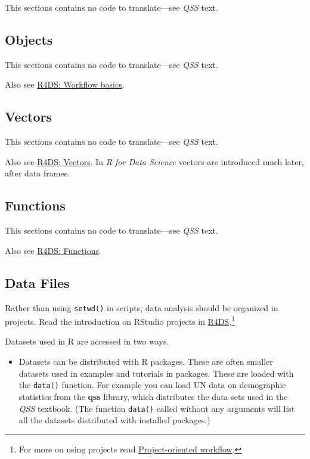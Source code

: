 \documentclass[]{book}
\providecommand{\tightlist}{%
  \setlength{\itemsep}{0pt}\setlength{\parskip}{0pt}}
\let\rmarkdownfootnote\footnote%
\def\footnote{\protect\rmarkdownfootnote}
\theoremstyle{definition}
\theoremstyle{definition}
\theoremstyle{definition}
\theoremstyle{remark}
\begin{document}
This sections contains no code to translate---see \emph{QSS} text.

\hypertarget{objects}{%
\subsection{Objects}\label{objects}}

This sections contains no code to translate---see \emph{QSS} text.

Also see \href{http://r4ds.had.co.nz/workflow-basics.html}{R4DS:
Workflow basics}.

\hypertarget{vectors}{%
\subsection{Vectors}\label{vectors}}

This sections contains no code to translate---see \emph{QSS} text.

Also see \href{http://r4ds.had.co.nz/vectors.html}{R4DS: Vectors}. In
\emph{R for Data Science} vectors are introduced much later, after data
frames.

\hypertarget{functions}{%
\subsection{Functions}\label{functions}}

This sections contains no code to translate---see \emph{QSS} text.

Also see \href{http://r4ds.had.co.nz/functions.html}{R4DS: Functions}.

\hypertarget{data-files}{%
\subsection{Data Files}\label{data-files}}

Rather than using \texttt{setwd()} in scripts, data analysis should be
organized in projects. Read the introduction on RStudio projects in
\href{http://r4ds.had.co.nz/workflow-projects.html}{R4DS}.\footnote{For
  more on using projects read
  \href{https://www.tidyverse.org/articles/2017/12/workflow-vs-script/}{Project-oriented
  workflow}.}

Datasets used in R are accessed in two ways.

\begin{itemize}
\tightlist
\item
  Datasets can be distributed with R packages. These are often smaller
  datasets used in examples and tutorials in packages. These are loaded
  with the \texttt{data()} function. For example you can load UN data on
  demographic statistics from the \textbf{qss} library, which
  distributes the data sets used in the \emph{QSS} textbook. (The
  function \texttt{data()} called without any arguments will list all
  the datasets distributed with installed packages.)
\end{itemize}
\end{document}
